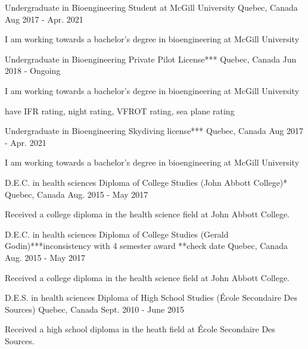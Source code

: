 \begin{cventries}
\cventry
    {Undergraduate in Bioengineering}
    {Student at McGill University}
    {Quebec, Canada}
    {Aug 2017 - Apr. 2021}
    {
      \begin{cvitems}
        \item {I am working towards a bachelor's degree in bioengineering at McGill University}
      \end{cvitems}
    }
    \cventry
    {Undergraduate in Bioengineering}
    {Private Pilot License***}
    {Quebec, Canada}
    {Jun 2018 - Ongoing}
    {
      \begin{cvitems}
        \item {I am working towards a bachelor's degree in bioengineering at McGill University}
        \item {have IFR rating, night rating, VFROT rating, sea plane rating}
      \end{cvitems}
    }
    \cventry
    {Undergraduate in Bioengineering}
    {Skydiving license***}
    {Quebec, Canada}
    {Aug 2017 - Apr. 2021}
    {
      \begin{cvitems}
        \item {I am working towards a bachelor's degree in bioengineering at McGill University}
      \end{cvitems}
    }
  \cventry
    {D.E.C. in health sciences}
    {Diploma of College Studies (John Abbott College)*}
    {Quebec, Canada}
    {Aug. 2015 - May 2017}
    {
      \begin{cvitems}
        \item {Received a college diploma in the health science field at John Abbott College.}
      \end{cvitems}
    }
    \cventry
    {D.E.C. in health sciences}
    {Diploma of College Studies (Gerald Godin)***inconsistency with 4 semester award **check date}
    {Quebec, Canada}
    {Aug. 2015 - May 2017}
    {
      \begin{cvitems}
        \item {Received a college diploma in the health science field at John Abbott College.}
      \end{cvitems}
    }
    \cventry
    {D.E.S. in health sciences}
    {Diploma of High School Studies (École Secondaire Des Sources)}
    {Quebec, Canada}
    {Sept. 2010 - June 2015}
    {
      \begin{cvitems}
        \item {Received a high school diploma in the heath field at École Secondaire Des Sources.}
      \end{cvitems}
    }
\end{cventries}
